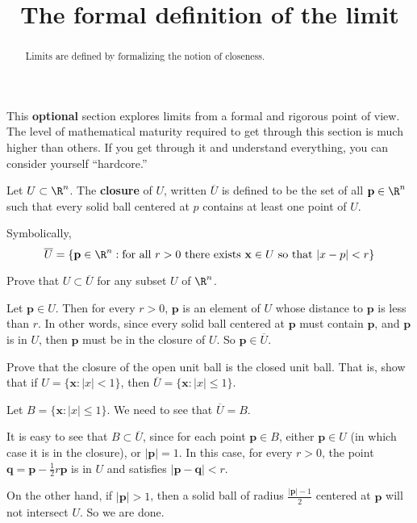 \documentclass{ximera}
\title{ The formal definition of the limit}
\begin{document}
\begin{abstract}
	Limits are defined by formalizing the notion of closeness.
\end{abstract}

This \textbf{optional} section explores limits from a formal and rigorous point of view.   
The level of mathematical maturity required to get through this section is much higher than others. 
If you get through it and understand everything, you can consider yourself ``hardcore.''

\begin{definition}
	Let $U \subset \R^n$.  The \textbf{closure} of $U$, written $\overline{U}$ is defined to be the set of all $\mathbf{p} \in \R^n$ such that
	every solid ball centered at $p$ contains at least one point of $U$.

        Symbolically,
	\[\overline{U} = \{ \mathbf{p} \in \R^n : \text{for all $r>0$ there exists $\mathbf{x} \in U$ so that $|x-p|<r$} \}\]
\end{definition}

Prove that $U \subset \overline{U}$ for any subset $U$ of $\R^n$.
\begin{free-response}
	
	Let $\mathbf{p} \in U$.  Then for every $r >0$, $\mathbf{p}$ is an element of $U$ whose distance to $\mathbf{p}$ is less than $r$.  In other words,
	since every solid ball centered at $\mathbf{p}$ must contain $\mathbf{p}$, and $\mathbf{p}$ is in $U$, then $\mathbf{p}$ must be in the closure of $U$. 
	So $\mathbf{p} \in \overline{U}$.
	
\end{free-response}


Prove that the closure of the open unit ball is the closed unit ball.  That is, show that if $U = \{\mathbf{x}:|x|<1\}$, then $\overline{U}  = \{\mathbf{x}:|x|\leq 1\}$.

\begin{free-response}
	 Let $B = \{\mathbf{x}:|x|\leq 1\}$.  We need to see that $\overline{U} = B$.
	 
	 It is easy to see that $B \subset \overline{U}$, since for each point $\mathbf{p} \in B$, either $\mathbf{p} \in U$ (in which case it is in the closure), 
	 or $|\mathbf{p}| = 1$.  In this case, for every $r > 0$, the point $\mathbf{q} = \mathbf{p} - \frac{1}{2}r\mathbf{p}$ is in $U$ and satisfies 
	  $|\mathbf{p} - \mathbf{q}|<r$.
	  
	  On the other hand, if $|\mathbf{p}|>1$, then a solid ball of radius $\frac{|\mathbf{p}|-1}{2}$ centered at $\mathbf{p}$ will not intersect $U$.  So we are done.
\end{free-response}
\end{document}
